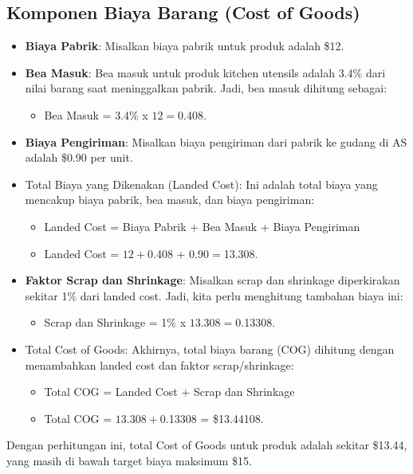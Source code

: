 \documentclass{article}
\begin{document}
\subsection{Komponen Biaya Barang (Cost of Goods)}
\begin{itemize}
    \item \textbf{Biaya Pabrik}: Misalkan biaya pabrik untuk produk adalah \$12.
    \item \textbf{Bea Masuk}: Bea masuk untuk produk kitchen utensils adalah 3.4\% dari nilai barang saat meninggalkan pabrik. Jadi, bea masuk dihitung sebagai:
          \begin{itemize}
              \item Bea Masuk = 3.4\% x $12 = $0.408.
          \end{itemize}
    \item \textbf{Biaya Pengiriman}: Misalkan biaya pengiriman dari pabrik ke gudang di AS adalah \$0.90 per unit.
    \item Total Biaya yang Dikenakan (Landed Cost): Ini adalah total biaya yang mencakup biaya pabrik, bea masuk, dan biaya pengiriman:
          \begin{itemize}
              \item Landed Cost = Biaya Pabrik + Bea Masuk + Biaya Pengiriman
              \item Landed Cost = $12 + $0.408 + $0.90 = $13.308.
          \end{itemize}
    \item \textbf{Faktor Scrap dan Shrinkage}: Misalkan scrap dan shrinkage diperkirakan sekitar 1\% dari landed cost. Jadi, kita perlu menghitung tambahan biaya ini:
          \begin{itemize}
              \item Scrap dan Shrinkage = 1\% x $13.308 = $0.13308.
          \end{itemize}
    \item Total Cost of Goods: Akhirnya, total biaya barang (COG) dihitung dengan menambahkan landed cost dan faktor scrap/shrinkage:
          \begin{itemize}
              \item Total COG = Landed Cost + Scrap dan Shrinkage
              \item Total COG = $13.308 + $0.13308 = \$13.44108.
          \end{itemize}
\end{itemize}
Dengan perhitungan ini, total Cost of Goods untuk produk adalah sekitar \$13.44, yang masih di bawah target biaya maksimum \$15.
\end{document}
